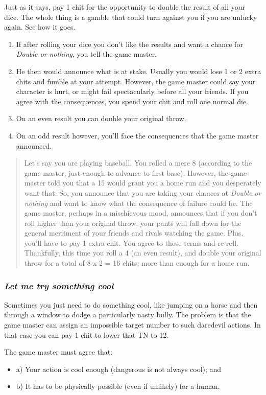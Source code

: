 Just as it says, pay 1 chit for the opportunity to double the result
of all your dice. The whole thing is a gamble that could turn against
you if you are unlucky again. See how it goes.
\begin{enumerate}
\item If after rolling your dice you don't like the results and want a chance
for \emph{Double or nothing}, you tell the game master.
\item He then would announce what is at stake. Usually you would lose 1
or 2 extra chits and fumble at your attempt. However, the game master
could say your character is hurt, or might fail spectacularly before
all your friends. If you agree with the consequences, you spend your
chit and roll one normal die. 
\item On an even result you can double your original throw. 
\item On an odd result however, you'll face the consequences that the game
master announced.\end{enumerate}
\begin{quote}
Let's say you are playing baseball. You rolled a mere 8 (according
to the game master, just enough to advance to first base). However,
the game master told you that a 15 would grant you a home run and
you desperately want that. So, you announce that you are taking your
chances at \emph{Double or nothing} and want to know what the consequence
of failure could be. The game master, perhaps in a mischievous mood,
announces that if you don't roll higher than your original throw,
your pants will fall down for the general merriment of your friends
and rivals watching the game. Plus, you'll have to pay 1 extra chit.
You agree to those terms and re-roll. Thankfully, this time you roll
a 4 (an even result), and double your original throw for a total of
8 x 2 = 16 chits; more than enough for a home run.
\end{quote}

\subsubsection*{\emph{Let me try something cool}}

Sometimes you just need to do something cool, like jumping on a horse
and then through a window to dodge a particularly nasty bully. The
problem is that the game master can assign an impossible target number
to such daredevil actions. In that case you can pay 1 chit to lower
that TN to 12.

\smallskip{}
The game master must agree that:
\begin{itemize}
\item a) Your action is cool enough (dangerous is not always cool); and
\item b) It has to be physically possible (even if unlikely) for a human.
\end{itemize}

